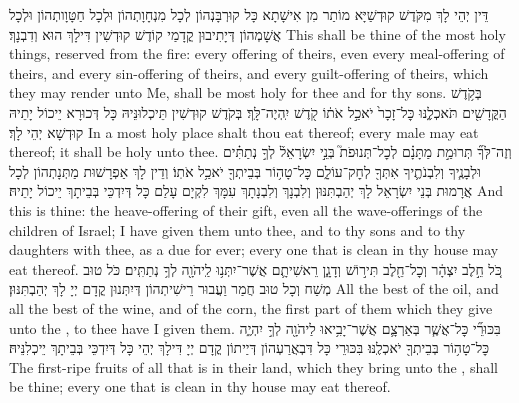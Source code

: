 {דֵּין יְהֵי לָךְ מִקֹּדֶשׁ קוּדְשַׁיָּא מוֹתַר מִן אִישָׁתָא כָּל קוּרְבָּנְהוֹן לְכָל מִנְחָוָתְהוֹן וּלְכָל חַטָּוָותְהוֹן וּלְכָל אֲשָׁמְהוֹן דְּיָתִיבוּן קֳדָמַי קוֹדֶשׁ קוּדְשִׁין דִּילָךְ הוּא וְדִבְנָךְ׃}
{This shall be thine of the most holy things, reserved from the fire: every offering of theirs, even every meal-offering of theirs, and every sin-offering of theirs, and every guilt-offering of theirs, which they may render unto Me, shall be most holy for thee and for thy sons.}{}
{בְּקֹ֥דֶשׁ הַקֳּדָשִׁ֖ים תֹּאכְלֶ֑נּוּ כׇּל־זָכָר֙ יֹאכַ֣ל אֹת֔וֹ קֹ֖דֶשׁ יִֽהְיֶה־לָּֽךְ׃
}
{בְּקֹדֶשׁ קוּדְשִׁין תֵּיכְלוּנֵּיהּ כָּל דְּכוּרָא יֵיכוֹל יָתֵיהּ קוּדְשָׁא יְהֵי לָךְ׃}
{In a most holy place shalt thou eat thereof; every male may eat thereof; it shall be holy unto thee.}{}
{וְזֶה־לְּךָ֞ תְּרוּמַ֣ת מַתָּנָ֗ם לְכׇל־תְּנוּפֹת֮ בְּנֵ֣י יִשְׂרָאֵל֒ לְךָ֣ נְתַתִּ֗ים וּלְבָנֶ֧יךָ וְלִבְנֹתֶ֛יךָ אִתְּךָ֖ לְחׇק־עוֹלָ֑ם כׇּל־טָה֥וֹר בְּבֵיתְךָ֖ יֹאכַ֥ל אֹתֽוֹ׃
}
{וְדֵין לָךְ אַפְרָשׁוּת מַתְּנָתְהוֹן לְכָל אֲרָמוּת בְּנֵי יִשְׂרָאֵל לָךְ יְהַבְתִּנּוּן וְלִבְנָךְ וְלִבְנָתָךְ עִמָּךְ לִקְיָם עָלַם כָּל דְּיִדְכֵּי בְּבֵיתָךְ יֵיכוֹל יָתֵיהּ׃}
{And this is thine: the heave-offering of their gift, even all the wave-offerings of the children of Israel; I have given them unto thee, and to thy sons and to thy daughters with thee, as a due for ever; every one that is clean in thy house may eat thereof.}{}
{כֹּ֚ל חֵ֣לֶב יִצְהָ֔ר וְכׇל־חֵ֖לֶב תִּיר֣וֹשׁ וְדָגָ֑ן רֵאשִׁיתָ֛ם אֲשֶׁר־יִתְּנ֥וּ לַֽיהֹוָ֖ה לְךָ֥ נְתַתִּֽים׃
}
{כֹּל טוּב מְשַׁח וְכָל טוּב חֲמַר וַעֲבוּר רֵישִׁיתְהוֹן דְּיִתְּנוּן קֳדָם יְיָ לָךְ יְהַבְתִּנּוּן׃}
{All the best of the oil, and all the best of the wine, and of the corn, the first part of them which they give unto the \lord, to thee have I given them.}{}
{בִּכּוּרֵ֞י כׇּל־אֲשֶׁ֧ר בְּאַרְצָ֛ם אֲשֶׁר־יָבִ֥יאוּ לַיהֹוָ֖ה לְךָ֣ יִהְיֶ֑ה כׇּל־טָה֥וֹר בְּבֵיתְךָ֖ יֹאכְלֶֽנּוּ׃}
{בִּכּוּרֵי כָּל דִּבְאֲרַעְהוֹן דְּיַיתוֹן קֳדָם יְיָ דִּילָךְ יְהֵי כָּל דְּיִדְכֵּי בְּבֵיתָךְ יֵיכְלִנֵּיהּ׃}
{The first-ripe fruits of all that is in their land, which they bring unto the \lord, shall be thine; every one that is clean in thy house may eat thereof.}{}
